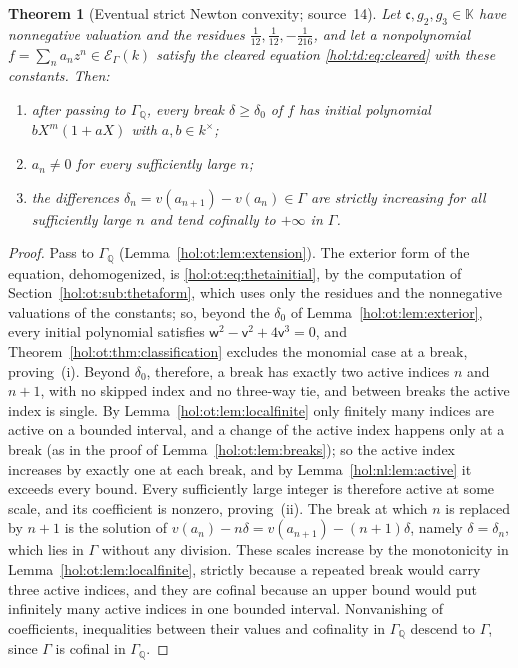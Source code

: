 \documentclass[11pt]{article}
\numberwithin{equation}{section}
\newtheorem{theorem}{Theorem}[section]
\theoremstyle{definition}
\theoremstyle{remark}
\newcommand{\Q}{\mathbb Q}
\newcommand{\KK}{\mathbb K}
\newcommand{\EK}{\mathcal E_\Gamma(k)}
\begin{document}
\begin{theorem}[Eventual strict Newton convexity; source~14]
\label{hol:ot:thm:convexity}
Let $\mathfrak c,g_2,g_3\in\KK$ have nonnegative valuation and the residues
$\frac1{12},\frac1{12},-\frac1{216}$, and let a nonpolynomial
$f=\sum_na_nz^n\in\EK$ satisfy the cleared equation \eqref{hol:td:eq:cleared}
with these constants. Then:
\begin{enumerate}[label=\textup{(\roman*)}]
\item after passing to $\Gamma_\Q$, every break $\delta\ge\delta_0$ of $f$ has
initial polynomial $bX^m(1+aX)$ with $a,b\in k^\times$;
\item $a_n\ne0$ for every sufficiently large $n$;
\item the differences $\delta_n=v(a_{n+1})-v(a_n)\in\Gamma$ are strictly
increasing for all sufficiently large $n$ and tend cofinally to $+\infty$ in
$\Gamma$.
\end{enumerate}
\end{theorem}

\begin{proof}
Pass to $\Gamma_\Q$ (Lemma~\ref{hol:ot:lem:extension}). The exterior form of
the equation, dehomogenized, is \eqref{hol:ot:eq:thetainitial}, by the
computation of Section~\ref{hol:ot:sub:thetaform}, which uses only the
residues and the nonnegative valuations of the constants; so, beyond the
$\delta_0$ of Lemma~\ref{hol:ot:lem:exterior}, every initial polynomial
satisfies $\mathsf w^2-\mathsf v^2+4\mathsf v^3=0$, and
Theorem~\ref{hol:ot:thm:classification} excludes the monomial case at a break,
proving~(i). Beyond $\delta_0$, therefore, a break has exactly two active
indices $n$ and $n+1$, with no skipped index and no three-way tie, and between
breaks the active index is single. By Lemma~\ref{hol:ot:lem:localfinite}
only finitely many indices are active on a bounded interval, and a change of
the active index happens only at a break (as in the proof of
Lemma~\ref{hol:ot:lem:breaks}); so the active index increases by exactly one
at each break, and by Lemma~\ref{hol:nl:lem:active} it exceeds every bound.
Every sufficiently large integer is therefore active at some scale, and its
coefficient is nonzero, proving~(ii). The break at which $n$ is replaced by
$n+1$ is the solution of $v(a_n)-n\delta=v(a_{n+1})-(n+1)\delta$, namely
$\delta=\delta_n$, which lies in $\Gamma$ without any division. These scales
increase by the monotonicity in Lemma~\ref{hol:ot:lem:localfinite}, strictly
because a repeated break would carry three active indices, and they are
cofinal because an upper bound would put infinitely many active indices in one
bounded interval. Nonvanishing of coefficients, inequalities between their
values and cofinality in $\Gamma_\Q$ descend to $\Gamma$, since $\Gamma$ is
cofinal in $\Gamma_\Q$.
\end{proof}
\end{document}
